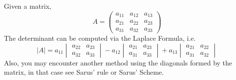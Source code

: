\documentclass[diffeq.tex]{subfiles}
\begin{document}
    \begin{example}
        Given a matrix,
        \begin{equation}
            A = \begin{pmatrix}
                a_{11} & a_{12} & a_{13}\\
                a_{21} & a_{22} & a_{23}\\
                a_{31} & a_{32} & a_{33}
            \end{pmatrix}
        \end{equation}
        The determinant can be computed via the Laplace Formula, i.e.
        \begin{equation}
            |A| = a_{11}\begin{vmatrix}
                a_{22} & a_{23}\\
                a_{32} & a_{33}
            \end{vmatrix} - a_{12}\begin{vmatrix}
                a_{21} & a_{23}\\
                a_{31} & a_{33}
            \end{vmatrix} + a_{13}\begin{vmatrix}
                a_{21} & a_{22}\\
                a_{31} & a_{32}
            \end{vmatrix}
        \end{equation}
        Also, you may encounter another method using the diagonals formed by the matrix, in that case see Sarus' rule or Sarus' Scheme.
    \end{example}
\end{document}
